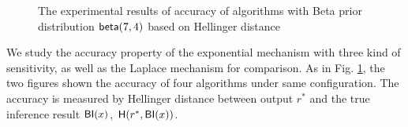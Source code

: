 \begin{figure}
\begin{center}
\centering
\caption{The experimental results of accuracy of algorithms with Beta prior distribution $\mathsf{beta}(7,4)$ based on Hellinger distance}
\label{fig_beta_hellinger}
\end{center}
\end{figure}

We study the accuracy property of the exponential mechanism with three kind of sensitivity, as well as the Laplace mechanism for comparison. As in Fig. \ref{fig_beta_hellinger}, the two figures shown the accuracy of four algorithms under same configuration. The accuracy is measured by Hellinger distance between output $r^*$ and the true inference result $\mathsf{BI}(x)$, $\mathsf{H}(r^*, \mathsf{BI}(x))$.

